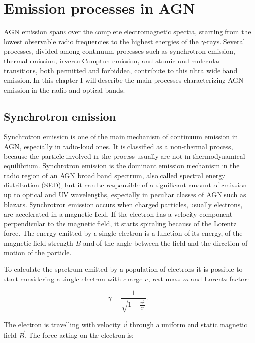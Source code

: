 \documentclass[../main.tex]{subfiles}
\begin{document}
\chapter{Emission processes in AGN}
\label{cap:emission}

AGN emission spans over the complete electromagnetic spectra, starting from the lowest observable radio frequencies to the highest energies of the $\gamma$-rays.
Several processes, divided among continuum processes such as synchrotron emission, thermal emission, inverse Compton emission, and atomic and molecular transitions, both permitted and forbidden, contribute to this ultra wide band emission.
In this chapter I will describe the main processes characterizing AGN emission in the radio and optical bands.

\section{Synchrotron emission}
\label{sec:synchrotron}

Synchrotron emission is one of the main mechanism of continuum emission in AGN, especially in radio-loud ones.
It is classified as a non-thermal process, because the particle involved in the process usually are not in thermodynamical equilibrium.
Synchrotron emission is the dominant emission mechanism in the radio region of an AGN broad band spectrum, also called spectral energy distribution (SED), but it can be responsible of a significant amount of emission up to optical and UV wavelengths, especially in peculiar classes of AGN such as blazars.
Synchrotron emission occurs when charged particles, usually electrons, are accelerated in a magnetic field.
If the electron has a velocity component perpendicular to the magnetic field, it starts spiraling because of the Lorentz force.
The energy emitted by a single electron is a function of its energy, of the magnetic field strength $B$ and of the angle between the field and the direction of motion of the particle.

To calculate the spectrum emitted by a population of electrons it is possible to start considering a single electron with charge $e$, rest mass $m$ and Lorentz factor:

\begin{equation}
    \label{eq:lorentz}
    \gamma = \frac{1}{\sqrt{1-\frac{v^2}{c^2}}}.
\end{equation}

The electron is travelling with velocity $\vec{v}$ through a uniform and static magnetic field $\vec{B}$.
The force acting on the electron is:
\end{document}
